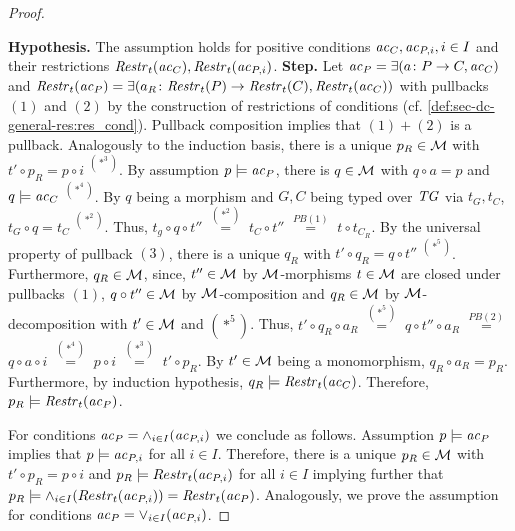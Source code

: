 \begin{proof}
\begin{center}
\end{center}
\textbf{Hypothesis.}
The assumption holds for positive conditions $\mathit{ac}_C,\mathit{ac}_{P,i},i \in I$ and their restrictions $\mathit{Restr}_t(\mathit{ac}_C),\mathit{Restr}_t(\mathit{ac}_{P,i})$.
\textbf{Step.}
Let $\mathit{ac}_P=\exists(a\colon P \to C,\mathit{ac}_C)$ and $\mathit{Restr}_t(\mathit{ac}_P)=\exists(a_R\colon \mathit{Restr}_t(P) \to \mathit{Restr}_t(C),\mathit{Restr}_t(\mathit{ac}_C))$ with pullbacks $(1)$ and $(2)$ by the construction of restrictions of conditions (cf. \cref{def:sec-dc-general-res:res_cond}).
Pullback composition implies that $(1)+(2)$ is a pullback.
Analogously to the induction basis, there is a unique $p_R \in {\cal M}$ with $t' \circ p_R=p \circ i$ $^{(*^3)}$.
By assumption $p \models \mathit{ac}_P$, there is $q \in {\cal M}$ with $q \circ a=p$ and $q \models \mathit{ac}_C$ $^{(*^4)}$.
By $q$ being a morphism and $G,C$ being typed over $\mathit{TG}$ via $t_G,t_C$, $t_G \circ q=t_C$ $^{(*^2)}$.
Thus, $t_g \circ q \circ t''$ $\stackrel{(*^2)}{=}$ $t_C \circ t''$ $\stackrel{PB (1)}{=}$ $t \circ t_{C_R}$.
By the universal property of pullback $(3)$, there is a unique $q_R$ with $t' \circ q_R=q \circ t''$ $^{(*^5)}$.
Furthermore, $q_R \in {\cal M}$, since, $t'' \in {\cal M}$ by ${\cal M}$-morphisms $t \in {\cal M}$ are closed under pullbacks $(1)$, $q \circ t'' \in {\cal M}$ by ${\cal M}$-composition and $q_R \in {\cal M}$ by ${\cal M}$-decomposition with $t' \in {\cal M}$ and $(*^5)$.
Thus, $t' \circ q_R \circ a_R$ $\stackrel{(*^5)}{=}$ $q \circ t'' \circ a_R$ $\stackrel{PB (2)}{=}$ $q \circ a \circ i$ $\stackrel{(*^4)}{=}$ $p \circ i$ $\stackrel{(*^3)}{=}$ $t' \circ p_R$.
By $t' \in {\cal M}$ being a monomorphism, $q_R \circ a_R=p_R$.
Furthermore, by induction hypothesis, $q_R \models \mathit{Restr}_t(\mathit{ac}_C)$.
Therefore, $p_R \models \mathit{Restr}_t(\mathit{ac}_P)$.

For conditions $\mathit{ac}_P=\wedge_{i \in I}(\mathit{ac}_{P,i})$ we conclude as follows.
Assumption $p \models \mathit{ac}_P$ implies that $p \models \mathit{ac}_{P,i}$ for all $i \in I$.
Therefore, there is a unique $p_R \in {\cal M}$ with $t' \circ p_R=p \circ i$ and $p_R \models Restr_t(\mathit{ac}_{P,i})$ for all $i \in I$ implying further that $p_R \models \wedge_{i \in I}(Restr_t(\mathit{ac}_{P,i}))=\mathit{Restr}_t(\mathit{ac}_P)$.
Analogously, we prove the assumption for conditions $\mathit{ac}_P=\vee_{i \in I}(\mathit{ac}_{P,i})$.
\end{proof}

